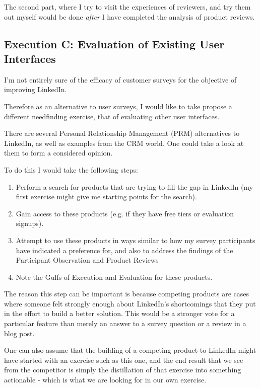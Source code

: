 \documentclass[
	letterpaper, %
]{jdf}
\begin{document}
The second part, where I try to visit the experiences of reviewers, and try them out myself would be done \textit{after} I have completed the analysis of product reviews.



\subsection{Execution C: Evaluation of Existing User Interfaces}
I'm not entirely sure of the efficacy of customer surveys for the objective of improving LinkedIn. 

Therefore as an alternative to user surveys, I would like to take propose a different needfinding exercise, that of evaluating other user interfaces.

There are several Personal Relationship Management (PRM) alternatives to LinkedIn, as well as examples from the CRM world. One could take a look at them to form a considered opinion.

To do this I would take the following steps:
\begin{enumerate}
    \item Perform a search for products that are trying to fill the gap in LinkedIn (my first exercise might give me starting points for the search).
    \item Gain access to these products (e.g. if they have free tiers or evaluation signups).
    \item Attempt to use these products in ways similar to how my survey participants have indicated a preference for, and also to address the findings of the Participant Observation and Product Reviews
    \item Note the Gulfs of Execution and Evaluation for these products.
\end{enumerate}

The reason this step can be important is because competing products are cases where someone felt strongly enough about LinkedIn's shortcomings that they put in the effort to build a better solution. This would be a stronger vote for a particular feature than merely an answer to a survey question or a review in a blog post. 

One can also assume that the building of a competing product to LinkedIn might have started with an exercise such as this one, and the end result that we see from the competitor is simply the distillation of that exercise into something actionable - which is what we are looking for in our own exercise.
\end{document}
